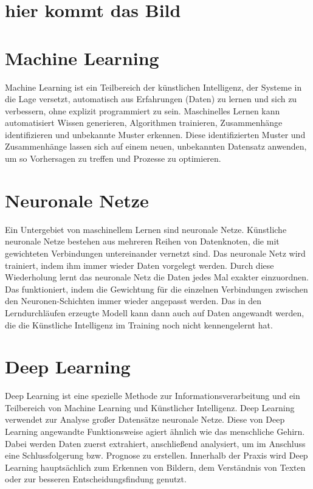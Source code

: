 \documentclass{report}
\begin{document}
\section {hier kommt das Bild}

 \section{Machine Learning}
 Machine Learning ist ein Teilbereich der künstlichen Intelligenz, der Systeme in die Lage versetzt, automatisch 
 aus Erfahrungen (Daten) zu lernen und sich zu verbessern, ohne explizit programmiert zu sein.
 Maschinelles Lernen kann automatisiert Wissen generieren, Algorithmen trainieren, Zusammenhänge identifizieren und unbekannte Muster erkennen. 
 Diese identifizierten Muster und Zusammenhänge lassen sich auf einem neuen, unbekannten Datensatz anwenden, 
 um so Vorhersagen zu treffen und Prozesse zu optimieren.

\section{Neuronale Netze}
 Ein Untergebiet von maschinellem Lernen sind neuronale Netze. Künstliche neuronale Netze bestehen aus mehreren Reihen von Datenknoten, 
 die mit gewichteten Verbindungen untereinander vernetzt sind.
Das neuronale Netz wird trainiert, indem ihm immer wieder Daten vorgelegt werden. Durch diese Wiederholung lernt
das neuronale Netz die Daten jedes Mal exakter einzuordnen. Das funktioniert, indem die Gewichtung für die einzelnen Verbindungen
 zwischen den Neuronen-Schichten immer wieder angepasst werden. Das in den Lerndurchläufen 
erzeugte Modell kann dann auch auf Daten angewandt werden, die die Künstliche Intelligenz im Training noch nicht kennengelernt hat.


 \section{Deep Learning} 
 Deep Learning ist eine spezielle Methode zur Informationsverarbeitung und ein Teilbereich von Machine Learning und Künstlicher 
 Intelligenz. Deep Learning verwendet zur Analyse großer Datensätze neuronale Netze. Diese von Deep Learning angewandte Funktionsweise
  agiert ähnlich wie das menschliche Gehirn. Dabei werden Daten zuerst extrahiert, anschließend analysiert, um im Anschluss eine 
  Schlussfolgerung bzw. Prognose zu erstellen. Innerhalb der Praxis wird Deep Learning hauptsächlich zum Erkennen von Bildern,
   dem Verständnis von Texten oder zur besseren Entscheidungsfindung genutzt. 
\end{document}
